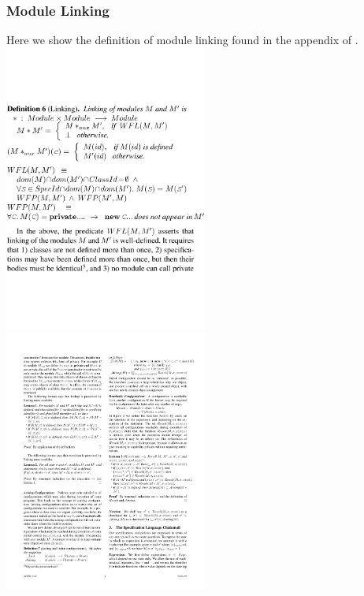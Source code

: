 \documentclass[a4paper,11pt,twoside]{article}
\begin{document}
{\subsubsection{Module Linking}\label{app:modulelinking}
Here we show the definition of module linking found in the appendix of \cite{drossopoulou2015b}.\\
\includegraphics[trim={0 5cm 0 5cm},width=0.5\textwidth,valign=t]{figures/app_modlink1.pdf}\linebreak
\includegraphics[width=0.5\textwidth,valign=t]{figures/app_modlink2.pdf}
\clearpage
}
\end{document}
